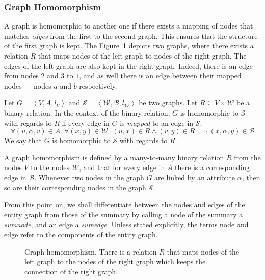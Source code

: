 \subsubsection{Graph Homomorphism}

A graph is homomorphic to another one if there exists a mapping of nodes that matches \emph{edges} from the first to the second graph. This ensures that the structure of the first graph is kept.
The Figure~\ref{fig:homomorphism} depicts two graphs, where there exists a relation $R$ that maps nodes of the left graph to nodes of the right graph. The edges of the left graph are also kept in the right graph. Indeed, there is an edge from nodes $2$ and $3$ to $1$, and as well there is an edge between their mapped nodes --- nodes $a$ and $b$ respectively.

\begin{definition}
Let $G=\left\langle V, A, l_V \right\rangle$ and $\mathcal{S}=\left\langle \mathcal{W}, \mathcal{B}, l_\mathcal{W} \right\rangle$ be two graphs. Let $R \subseteq V \times \mathcal{W}$ be a binary relation.
In the context of the binary relation, $G$ is homomorphic to $\mathcal{S}$ with regards to $R$ if every edge in $G$ is \emph{mapped} to an edge in $\mathcal{S}$:
$$
\forall (u, \alpha, v) \in A\;\; \forall (x, y) \in \mathcal{W}\;\; (u, x) \in R \wedge (v, y) \in R \implies (x, \alpha, y) \in \mathcal{B}
$$
We say that $G$ is homomorphic to $\mathcal{S}$ with regards to $R$.
\end{definition}

A graph homomorphism is defined by a many-to-many binary relation $R$ from the nodes $V$ to the nodes $\mathcal{W}$, and that for every edge in $A$ there is a corresponding edge in $\mathcal{B}$. Whenever two nodes in the graph $G$ are linked by an attribute $\alpha$, then so are their corresponding nodes in the graph $\mathcal{S}$.\\

\begin{remark}
From this point on, we shall differentiate between the nodes and edges of the entity graph from those of the summary by calling a node of the summary a \emph{sumnode}, and an edge a \emph{sumedge}. Unless stated explicitly, the terms node and edge refer to the components of the entity graph.
\end{remark}

\begin{figure}
	\centering
	
	\caption{Graph homomorphism. There is a relation $R$ that maps nodes of the left graph to the nodes of the right graph which keeps the connection of the right graph.}
	\label{fig:homomorphism}
\end{figure}

